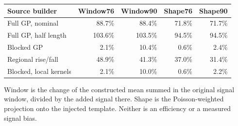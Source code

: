 \begin{center}\small\begin{tabular}{lrrrr}\toprule
Source builder & Window76 & Window90 & Shape76 & Shape90\\\midrule
Full GP, nominal & 88.7\% & 88.4\% & 71.8\% & 71.7\%\\
Full GP, half length & 103.6\% & 103.5\% & 94.5\% & 94.5\%\\
Blocked GP & 2.1\% & 10.4\% & 0.6\% & 2.4\%\\
Regional rise/fall & 48.9\% & 41.3\% & 37.0\% & 31.4\%\\
Blocked, local kernels & 2.1\% & 10.0\% & 0.6\% & 2.2\%\\
\bottomrule\end{tabular}\end{center}
Window is the change of the constructed mean summed in the original signal window, divided by the added signal there. Shape is the Poisson-weighted projection onto the injected template. Neither is an efficiency or a measured signal bias.
